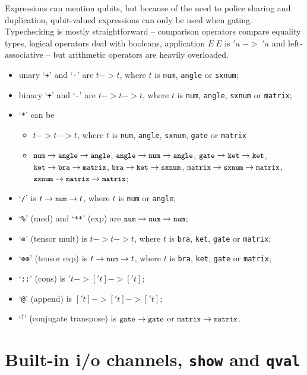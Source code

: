 \documentclass[11pt,a4paper]{book}
\newcommand{\verbtt}[1]{\texttt{\small{}#1}}
\begin{document}
Expressions can mention qubits, but because of the need to police sharing and duplication, qubit-valued expressions can only be used when gating. Typechecking is mostly straightforward -- comparison operators compare equality types, logical operators deal with booleans, application $E\ E$ is $'a\;->\;'a$ and left-associative -- but arithmetic operators are heavily overloaded.
\begin{itemize}
\item unary `\verbtt{+}' and `\verbtt{-}' are $t->t$, where $t$ is \verbtt{num}, \verbtt{angle} or \verbtt{sxnum};
\item binary `\verbtt{+}' and `\verbtt{-}' are $t->t->t$, where $t$ is \verbtt{num}, \verbtt{angle}, \verbtt{sxnum} or \verbtt{matrix};
\item `\verbtt{*}' can be 
\begin{itemize}
	\item $t->t->t$, where $t$ is \verbtt{num}, \verbtt{angle}, \verbtt{sxnum}, \verbtt{gate} or \verbtt{matrix}
	\item $\verbtt{num}->\verbtt{angle}->\verbtt{angle}$, $\verbtt{angle}->\verbtt{num}->\verbtt{angle}$, $\verbtt{gate}->\verbtt{ket}->\verbtt{ket}$, $\verbtt{ket}->\verbtt{bra}->\verbtt{matrix}$, $\verbtt{bra}->\verbtt{ket}->\verbtt{sxnum}$, $\verbtt{matrix}->\verbtt{sxnum}->\verbtt{matrix}$, $\verbtt{sxnum}->\verbtt{matrix}->\verbtt{matrix}$;
\end{itemize}
\item `\verbtt{/}' is $t->\verbtt{num}->t$, where $t$ is \verbtt{num} or \verbtt{angle};
\item `\verbtt{\%}' (mod) and `\verbtt{**}' (exp) are $\verbtt{num}->\verbtt{num}->\verbtt{num}$;
\item `\verbtt{⊗}' (tensor mult) is $t->t->t$, where $t$ is \verbtt{bra}, \verbtt{ket}, \verbtt{gate} or \verbtt{matrix};
\item `\verbtt{⊗⊗}' (tensor exp) is $t->\verbtt{num}->t$, where $t$ is \verbtt{bra}, \verbtt{ket}, \verbtt{gate} or \verbtt{matrix};
\item `\verbtt{::}' (cons) is $'t->['t]->['t]$;
\item `\verbtt{@}' (append) is $['t]->['t]->['t]$;
\item `\ensuremath{^{\dag}}' (conjugate transpose) is $\verbtt{gate}->\verbtt{gate}$ or $\verbtt{matrix}->\verbtt{matrix}$.
\end{itemize}


\section{Built-in i/o channels, \verbtt{show} and \verbtt{qval}}
\end{document}
